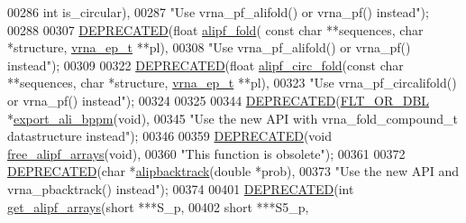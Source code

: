 \begin{DoxyCode}
00286                       \textcolor{keywordtype}{int} is\_circular),
00287           \textcolor{stringliteral}{"Use vrna\_pf\_alifold() or vrna\_pf() instead"});
00288 
00307 \mbox{\hyperlink{alifold_8h_aab347a3c03fbe8e7319551b9fa0cce4a}{DEPRECATED}}(\textcolor{keywordtype}{float} \mbox{\hyperlink{group__consensus__pf__fold_ga1a5f6cfb9d761fa862ce4edc7c369cd2}{alipf\_fold}}( \textcolor{keyword}{const} \textcolor{keywordtype}{char} **sequences, \textcolor{keywordtype}{char} *structure, 
      \mbox{\hyperlink{group__struct__utils_structvrna__elem__prob__s}{vrna\_ep\_t}} **pl),
00308           \textcolor{stringliteral}{"Use vrna\_pf\_alifold() or vrna\_pf() instead"});
00309 
00322 \mbox{\hyperlink{alifold_8h_aab347a3c03fbe8e7319551b9fa0cce4a}{DEPRECATED}}(\textcolor{keywordtype}{float} \mbox{\hyperlink{group__consensus__pf__fold_ga604a42ad64178279551ad3e4def3d603}{alipf\_circ\_fold}}(\textcolor{keyword}{const} \textcolor{keywordtype}{char} **sequences, \textcolor{keywordtype}{char} *structure, 
      \mbox{\hyperlink{group__struct__utils_structvrna__elem__prob__s}{vrna\_ep\_t}} **pl),
00323           \textcolor{stringliteral}{"Use vrna\_pf\_circalifold() or vrna\_pf() instead"});
00324 
00325 
00344 \mbox{\hyperlink{alifold_8h_aab347a3c03fbe8e7319551b9fa0cce4a}{DEPRECATED}}(\mbox{\hyperlink{group__data__structures_ga31125aeace516926bf7f251f759b6126}{FLT\_OR\_DBL}} *\mbox{\hyperlink{group__consensus__pf__fold_ga11b6ab8bd9be1821fea352b190a01cab}{export\_ali\_bppm}}(\textcolor{keywordtype}{void}),
00345           \textcolor{stringliteral}{"Use the new API with vrna\_fold\_compound\_t datastructure instead"});
00346 
00359 \mbox{\hyperlink{alifold_8h_aab347a3c03fbe8e7319551b9fa0cce4a}{DEPRECATED}}(\textcolor{keywordtype}{void}  \mbox{\hyperlink{group__consensus__pf__fold_ga0c0498f35686e26b38ee460d3db1a661}{free\_alipf\_arrays}}(\textcolor{keywordtype}{void}),
00360           \textcolor{stringliteral}{"This function is obsolete"});
00361 
00372 \mbox{\hyperlink{alifold_8h_aab347a3c03fbe8e7319551b9fa0cce4a}{DEPRECATED}}(\textcolor{keywordtype}{char}  *\mbox{\hyperlink{group__consensus__stochbt_ga0df40248788f0fb17ebdc59d74116d1c}{alipbacktrack}}(\textcolor{keywordtype}{double} *prob),
00373           \textcolor{stringliteral}{"Use the new API and vrna\_pbacktrack() instead"});
00374 
00401 \mbox{\hyperlink{alifold_8h_aab347a3c03fbe8e7319551b9fa0cce4a}{DEPRECATED}}(\textcolor{keywordtype}{int} \mbox{\hyperlink{group__consensus__fold_ga5349960075b1847720a2e9df021e2675}{get\_alipf\_arrays}}(\textcolor{keywordtype}{short} ***S\_p,
00402                      \textcolor{keywordtype}{short} ***S5\_p,

\end{DoxyCode}
